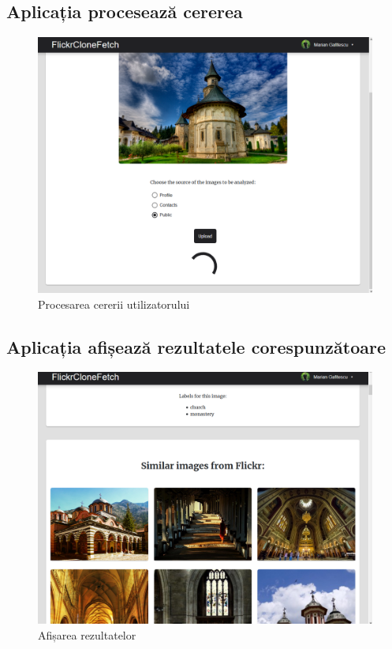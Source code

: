 \pagebreak
\subsection{Aplicația procesează cererea}
\begin{figure}[!htbp]
    \begin{center}
        \includegraphics[width=1.0\textwidth]{images/loading.png}
        \caption{Procesarea cererii utilizatorului }
    \end{center}
\end{figure}

\pagebreak
\subsection{Aplicația afișează rezultatele corespunzătoare}
\begin{figure}[!htbp]
    \begin{center}
        \includegraphics[width=1.0\textwidth]{images/results.png}
        \caption{Afișarea rezultatelor }
    \end{center}
\end{figure}